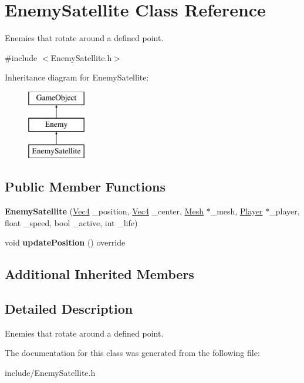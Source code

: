 \hypertarget{classEnemySatellite}{}\section{Enemy\+Satellite Class Reference}
\label{classEnemySatellite}


Enemies that rotate around a defined point.  




{\ttfamily \#include $<$Enemy\+Satellite.\+h$>$}

Inheritance diagram for Enemy\+Satellite\+:\begin{figure}[H]
\begin{center}
\leavevmode
\includegraphics[height=3.000000cm]{classEnemySatellite}
\end{center}
\end{figure}
\subsection*{Public Member Functions}
\begin{DoxyCompactItemize}
\item 
{\bfseries Enemy\+Satellite} (\hyperlink{classVec4}{Vec4} \+\_\+position, \hyperlink{classVec4}{Vec4} \+\_\+center, \hyperlink{classMesh}{Mesh} $\ast$\+\_\+mesh, \hyperlink{classPlayer}{Player} $\ast$\+\_\+player, float \+\_\+speed, bool \+\_\+active, int \+\_\+life)\hypertarget{classEnemySatellite_af58da30acb9af47b7d40ae80b76008e8}{}\label{classEnemySatellite_af58da30acb9af47b7d40ae80b76008e8}

\item 
void {\bfseries update\+Position} () override\hypertarget{classEnemySatellite_a07c15081994ca6f402659ffd5ac771b4}{}\label{classEnemySatellite_a07c15081994ca6f402659ffd5ac771b4}

\end{DoxyCompactItemize}
\subsection*{Additional Inherited Members}


\subsection{Detailed Description}
Enemies that rotate around a defined point. 

The documentation for this class was generated from the following file\+:\begin{DoxyCompactItemize}
\item 
include/Enemy\+Satellite.\+h\end{DoxyCompactItemize}
